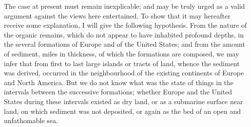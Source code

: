 \indent The case at present must remain inexplicable; and may be truly urged as a valid argument against the views here entertained. To show that it may hereafter receive some explanation, I will give the following hypothesis. From the nature of the organic remains, which do not appear to have inhabited profound depths, in the several formations of Europe and of the United States; and from the amount of sediment, miles in thickness, of which the formations are composed, we may infer that from first to last large islands or tracts of land, whence the sediment was derived, occurred in the neighbourhood of the existing continents of Europe and North America. But we do not know what was the state of things in the intervals between the successive formations; whether Europe and the United States during these intervals existed as dry land, or as a submarine surface near land, on which sediment was not deposited, or again as the bed of an open and unfathomable sea.\\
